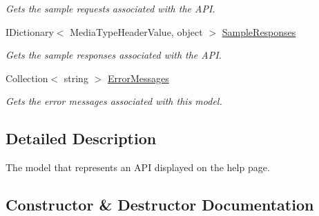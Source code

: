 \begin{DoxyCompactItemize}
\begin{DoxyCompactList}\small\item\em Gets the sample requests associated with the A\+PI. \end{DoxyCompactList}\item 
I\+Dictionary$<$ Media\+Type\+Header\+Value, object $>$ \hyperlink{class_open_1_1_g_i_1_1hypermart_1_1_areas_1_1_help_page_1_1_models_1_1_help_page_api_model_a08ca3610bd41722c64d0a58231e358a3}{Sample\+Responses}
\begin{DoxyCompactList}\small\item\em Gets the sample responses associated with the A\+PI. \end{DoxyCompactList}\item 
Collection$<$ string $>$ \hyperlink{class_open_1_1_g_i_1_1hypermart_1_1_areas_1_1_help_page_1_1_models_1_1_help_page_api_model_a318df386bf722bfbafab9a6f2812641e}{Error\+Messages}
\begin{DoxyCompactList}\small\item\em Gets the error messages associated with this model. \end{DoxyCompactList}\end{DoxyCompactItemize}


\subsection{Detailed Description}
The model that represents an A\+PI displayed on the help page. 



\subsection{Constructor \& Destructor Documentation}
\hypertarget{class_open_1_1_g_i_1_1hypermart_1_1_areas_1_1_help_page_1_1_models_1_1_help_page_api_model_a34aa95dfea87b53bcfac8601fb1f3b93}{}\label{class_open_1_1_g_i_1_1hypermart_1_1_areas_1_1_help_page_1_1_models_1_1_help_page_api_model_a34aa95dfea87b53bcfac8601fb1f3b93} 
